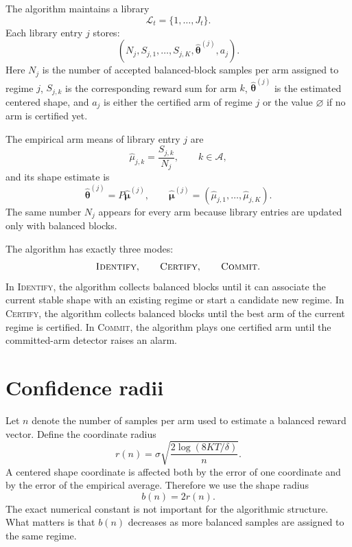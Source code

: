 \documentclass[11pt]{article}
\newcommand{\A}{\mathcal A}
\newcommand{\Lcal}{\mathcal L}
\newcommand{\ID}{\textsc{Identify}}
\newcommand{\CERT}{\textsc{Certify}}
\newcommand{\COMMIT}{\textsc{Commit}}
\begin{document}
The algorithm maintains a library
\begin{equation}
    \Lcal_t=\{1,\ldots,J_t\}.
\end{equation}
Each library entry $j$ stores:
\begin{equation}
    \left(N_j,S_{j,1},\ldots,S_{j,K},\widehat{\bm\theta}^{(j)},a_j\right).
\end{equation}
Here $N_j$ is the number of accepted balanced-block samples per arm assigned to regime $j$, $S_{j,k}$ is the corresponding reward sum for arm $k$, $\widehat{\bm\theta}^{(j)}$ is the estimated centered shape, and $a_j$ is either the certified arm of regime $j$ or the value $\varnothing$ if no arm is certified yet.

The empirical arm means of library entry $j$ are
\begin{equation}
    \widehat\mu_{j,k}=\frac{S_{j,k}}{N_j},
    \qquad k\in\A,
\end{equation}
and its shape estimate is
\begin{equation}
    \widehat{\bm\theta}^{(j)}=P\widehat{\bm\mu}^{(j)},
    \qquad
    \widehat{\bm\mu}^{(j)}=(\widehat\mu_{j,1},\ldots,\widehat\mu_{j,K}).
    \label{eq:library-shape}
\end{equation}
The same number $N_j$ appears for every arm because library entries are updated only with balanced blocks.

The algorithm has exactly three modes:
\begin{equation}
    \ID,
    \qquad
    \CERT,
    \qquad
    \COMMIT.
\end{equation}
In \ID, the algorithm collects balanced blocks until it can associate the current stable shape with an existing regime or start a candidate new regime. In \CERT, the algorithm collects balanced blocks until the best arm of the current regime is certified. In \COMMIT, the algorithm plays one certified arm until the committed-arm detector raises an alarm.

\section{Confidence radii}

Let $n$ denote the number of samples per arm used to estimate a balanced reward vector. Define the coordinate radius
\begin{equation}
    r(n)=\sigma\sqrt{\frac{2\log(8KT/\delta)}{n}}.
    \label{eq:coord-radius}
\end{equation}
A centered shape coordinate is affected both by the error of one coordinate and by the error of the empirical average. Therefore we use the shape radius
\begin{equation}
    b(n)=2r(n).
    \label{eq:shape-radius}
\end{equation}
The exact numerical constant is not important for the algorithmic structure. What matters is that $b(n)$ decreases as more balanced samples are assigned to the same regime.
\end{document}

